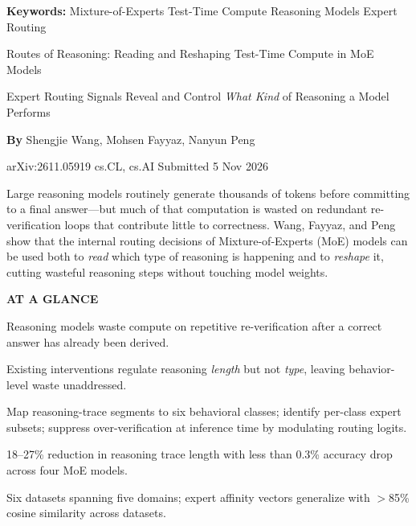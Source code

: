 \documentclass[10pt,twocolumn]{article}
\begin{document}
\setlength{\parindent}{0pt}
\setlength{\parskip}{4pt}

{\small\color{keywordgray}\textbf{Keywords:}
  Mixture-of-Experts \textbullet{} Test-Time Compute \textbullet{} Reasoning Models \textbullet{} Expert Routing}\par\vspace{4pt}

{\LARGE\bfseries\raggedright Routes of Reasoning: Reading and Reshaping Test-Time Compute in MoE Models}\par\vspace{4pt}
{\large\itshape\raggedright Expert Routing Signals Reveal and Control \emph{What Kind} of Reasoning a Model Performs}\par\vspace{6pt}
{\small\textbf{By} Shengjie Wang, Mohsen Fayyaz, Nanyun Peng}\par\vspace{2pt}
{\small\color{keywordgray}arXiv:2611.05919 \textbullet{} cs.CL, cs.AI \textbullet{} Submitted 5 Nov 2026}
\par\vspace{2pt}\noindent{\color{rulered}\rule{\columnwidth}{0.6pt}}\vspace{6pt}

Large reasoning models routinely generate thousands of tokens before committing to a final answer---but much of that computation is wasted on redundant re-verification loops that contribute little to correctness.
Wang, Fayyaz, and Peng show that the internal routing decisions of Mixture-of-Experts (MoE) models can be used both to \emph{read} which type of reasoning is happening and to \emph{reshape} it, cutting wasteful reasoning steps without touching model weights.

\begin{mdframed}[backgroundcolor=boxgray,linecolor=rulered,linewidth=1pt,
    innerleftmargin=6pt,innerrightmargin=6pt,
    innertopmargin=6pt,innerbottommargin=6pt]
\textbf{\small AT A GLANCE}\par\vspace{4pt}
\begin{description}[leftmargin=0pt,labelsep=4pt,itemsep=2pt,parsep=0pt,
    font=\small\bfseries]
  \item[Problem:] Reasoning models waste compute on repetitive re-verification after a correct answer has already been derived.
  \item[Why it matters:] Existing interventions regulate reasoning \emph{length} but not \emph{type}, leaving behavior-level waste unaddressed.
  \item[Method:] Map reasoning-trace segments to six behavioral classes; identify per-class expert subsets; suppress over-verification at inference time by modulating routing logits.
  \item[Result:] 18--27\% reduction in reasoning trace length with less than 0.3\% accuracy drop across four MoE models.
  \item[Evidence:] Six datasets spanning five domains; expert affinity vectors generalize with $>$85\% cosine similarity across datasets.
\end{description}
\end{mdframed}
\end{document}
